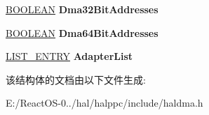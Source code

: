 \begin{DoxyCompactItemize}
\hyperlink{_processor_bind_8h_a112e3146cb38b6ee95e64d85842e380a}{B\+O\+O\+L\+E\+AN} {\bfseries Dma32\+Bit\+Addresses}
\item 
\mbox{\label{struct___a_d_a_p_t_e_r___o_b_j_e_c_t_a6f881d4845b1f571679d3cab046e5073}} 
\hyperlink{_processor_bind_8h_a112e3146cb38b6ee95e64d85842e380a}{B\+O\+O\+L\+E\+AN} {\bfseries Dma64\+Bit\+Addresses}
\item 
\mbox{\label{struct___a_d_a_p_t_e_r___o_b_j_e_c_t_a8da992a4b7a8036ceaffa6c2e1902253}} 
\hyperlink{struct___l_i_s_t___e_n_t_r_y}{L\+I\+S\+T\+\_\+\+E\+N\+T\+RY} {\bfseries Adapter\+List}
\end{DoxyCompactItemize}


该结构体的文档由以下文件生成\+:\begin{DoxyCompactItemize}
\item 
E\+:/\+React\+O\+S-\/0../hal/halppc/include/haldma.\+h\end{DoxyCompactItemize}
